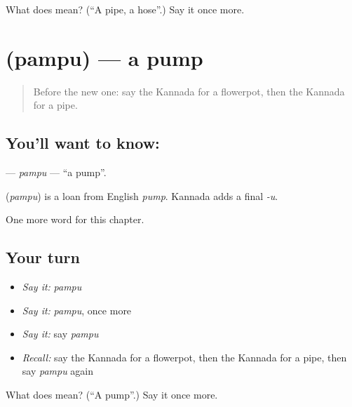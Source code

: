 \begin{tcolorbox}[breakable,colback=teal!4,colframe=teal!35!black,title={Before you move on}]
What does  mean? (\textquotedblleft{}A pipe, a hose\textquotedblright{}.) Say it once more.
\end{tcolorbox}
\section[\texorpdfstring{\kn{ಪಂಪು} (pampu)}{ಪಂಪು (pampu)}]{ (pampu) — a pump}

\label{lesson:KA-C267-pampu}



\begin{quote}
Before the new one: say the Kannada for a flowerpot, then the Kannada for a pipe.
\end{quote}

\subsection*{You'll want to know: }
\textbf{} — \emph{pampu} — \textquotedblleft{}a pump\textquotedblright{}.

\begin{cousinweb}
\textbf{} (\emph{pampu}) is a loan from English \emph{pump}. Kannada adds a final \emph{-u}.
\end{cousinweb}

\begin{grammarlens}[title={What you've built}]
One more word for this chapter.
\end{grammarlens}

\subsection*{Your turn}
\begin{itemize}
\raggedright
  \item \emph{Say it:} \emph{pampu}
  \item \emph{Say it:} \emph{pampu}, once more
  \item \emph{Say it:} say \emph{pampu}
  \item \emph{Recall:} say the Kannada for a flowerpot, then the Kannada for a pipe, then say \emph{pampu} again
\end{itemize}

\begin{tcolorbox}[breakable,colback=teal!4,colframe=teal!35!black,title={Before you move on}]
What does  mean? (\textquotedblleft{}A pump\textquotedblright{}.) Say it once more.
\end{tcolorbox}
